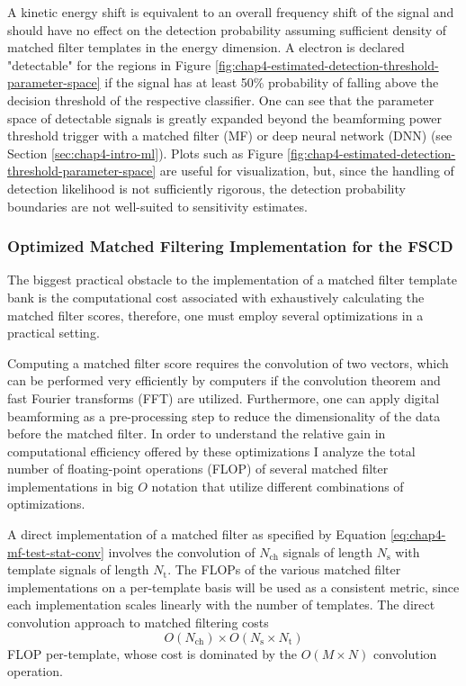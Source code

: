 A kinetic energy shift is equivalent to an overall frequency shift of the signal and should have no effect on the detection probability assuming sufficient density of matched filter templates in the energy dimension. A electron is declared "detectable" for the regions in Figure \ref{fig:chap4-estimated-detection-threshold-parameter-space} if the signal has at least 50\% probability of falling above the decision threshold of the respective classifier. One can see that the parameter space of detectable signals is greatly expanded beyond the beamforming power threshold trigger with a matched filter (MF) or deep neural network (DNN) (see Section \ref{sec:chap4-intro-ml}). Plots such as Figure \ref{fig:chap4-estimated-detection-threshold-parameter-space} are useful for visualization, but, since the handling of detection likelihood is not sufficiently rigorous, the detection probability boundaries are not well-suited to sensitivity estimates.

\subsubsection*{Optimized Matched Filtering Implementation for the FSCD}

The biggest practical obstacle to the implementation of a matched filter template bank is the computational cost associated with exhaustively calculating the matched filter scores, therefore, one must employ several optimizations in a practical setting. 

Computing a matched filter score requires the convolution of two vectors, which can be performed very efficiently by computers if the convolution theorem and fast Fourier transforms (FFT) are utilized. Furthermore, one can apply digital beamforming as a pre-processing step to reduce the dimensionality of the data before the matched filter. In order to understand the relative gain in computational efficiency offered by these optimizations I analyze the total number of floating-point operations (FLOP) of several matched filter implementations in big $O$ notation that utilize different combinations of optimizations. 

A direct implementation of a matched filter as specified by Equation \ref{eq:chap4-mf-test-stat-conv} involves the convolution of $N_\mathrm{ch}$ signals of length $N_\mathrm{s}$ with template signals of length $N_\mathrm{t}$. The FLOPs of the various matched filter implementations on a per-template basis will be used as a consistent metric, since each implementation scales linearly with the number of templates. The direct convolution approach to matched filtering costs
\begin{equation}
    O(N_\mathrm{ch})\times O(N_\mathrm{s}\times N_\mathrm{t})
\end{equation}
FLOP per-template, whose cost is dominated by the $O(M\times N)$ convolution operation. 

